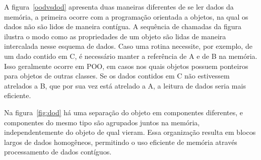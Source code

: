 A figura~\ref{oodvsdod} apresenta duas maneiras diferentes de se ler dados da memória, 
a primeira ocorre com a programação orientada a objetos, na qual os dados não são lidos 
de maneira contígua. A sequência de chamadas da figura ilustra o modo como as 
propriedades de um objeto são lidas de maneira intercalada nesse esquema de dados. 
Caso uma rotina necessite, por exemplo, de um dado contido em C, é necessário manter 
a referência de A e de B na memória. Isso geralmente ocorre em POO, em casos nos quais 
objetos possuem ponteiros para objetos de outras classes. Se os dados contidos em C não 
estivessem atrelados a B, que por sua vez está atrelado a A, a leitura de dados seria 
mais eficiente. 

Na figura~\ref{fig:dod} há uma separação do objeto em componentes diferentes, e 
componentes do mesmo tipo são agrupados juntos na memória, independentemente do objeto 
de qual vieram. Essa organização resulta em blocos largos de dados homogêneos, 
permitindo o uso eficiente de memória através processamento de dados contíguos. 

